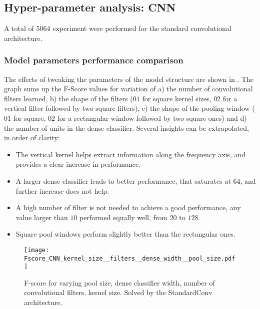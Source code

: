 \subsection{Hyper-parameter analysis: CNN}

A total of $5064$ experiment were performed for the standard convolutional
architecture.

\subsubsection{Model parameters performance comparison}

The effects of tweaking the parameters of the model structure are shown in
.
%
The graph sums up the F-Score values for variation of
%
a) the number of convolutional filters learned,
%
b) the shape of the filters ($01$ for square kernel sizes, $02$ for a vertical
filter followed by two square filters),
%
c) the shape of the pooling window ($01$ for square, $02$ for a rectangular
window followed by two square ones) and
%
d) the number of units in the dense classifier.
Several insights can be extrapolated, in order of clarity:

\begin{itemize}
    \item The vertical kernel helps extract information along the frequency axis,
        and provides a clear increase in performance.
    \item A larger dense classifier leads to better performance,
        that saturates at $64$, and further increase does not help.
    \item A high number of filter is not needed to achieve a good performance,
        any value larger than $10$ performed equally well, from $20$ to $128$.
    \item Square pool windows perform slightly better than the rectangular ones.
\end{itemize}


\begin{figure*}[h!]
    \centering
    \texttt{[image: Fscore\_CNN\_kernel\_size\_\_filters\_\_dense\_width\_\_pool\_size.pdf]}
    \caption{F-score for varying
        pool size,
        dense classifier width,
        number of convolutional filters,
        kernel size.
        Solved by the StandardConv architecture.
    }%
    \label{fig:cnn_comparison_kernel_filter_dense_pool}
\end{figure*}

